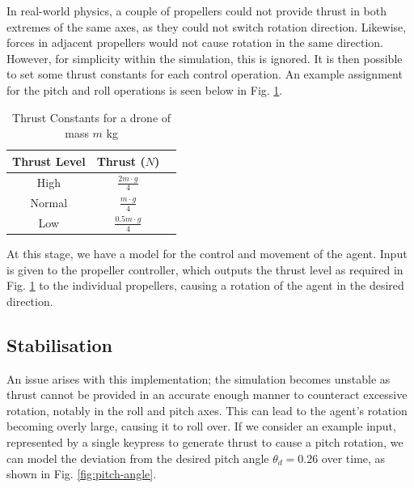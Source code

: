 \documentclass[12pt]{article}
\begin{document}
In real-world physics, a couple of propellers could not provide thrust in both extremes of the same axes, as they could not switch rotation direction. Likewise, forces in adjacent propellers would not cause rotation in the same direction. However, for simplicity within the simulation, this is ignored. It is then possible to set some thrust constants for each control operation. An example assignment for the pitch and roll operations is seen below in Fig. \ref{tab:thrust-constants}.

\begin{table}[ht]
    \begin{center}
    \begin{tabular}{| c | c | c |} 
    \hline
    Thrust Level & Thrust ($N$) \\ 
    \hline
    High & $\frac{2m \cdot g}{4}$\\
    \hline
    Normal & $\frac{m \cdot g}{4}$\\
    \hline
    Low & $\frac{0.5m \cdot g}{4}$\\
    \hline
    \end{tabular}
    \end{center}
    \caption{Thrust Constants for a drone of mass $m$ kg}
    \label{tab:thrust-constants}
\end{table}

At this stage, we have a model for the control and movement of the agent. Input is given to the propeller controller, which outputs the thrust level as required in Fig. \ref{tab:thrust-constants} to the individual propellers, causing a rotation of the agent in the desired direction.


\subsection{Stabilisation}
\label{sec:stabilisation}

An issue arises with this implementation; the simulation becomes unstable as thrust cannot be provided in an accurate enough manner to counteract excessive rotation, notably in the roll and pitch axes. This can lead to the agent's rotation becoming overly large, causing it to roll over. If we consider an example input, represented by a single keypress to generate thrust to cause a pitch rotation, we can model the deviation from the desired pitch angle $\theta_{d} = 0.26$ over time, as shown in Fig. \ref{fig:pitch-angle}.
\end{document}

